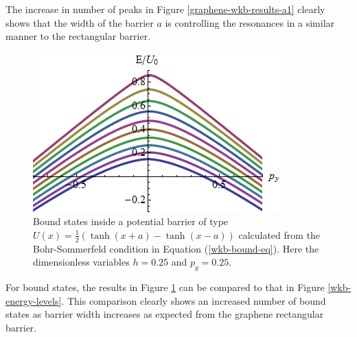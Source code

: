 			The increase in number of peaks in Figure \ref{graphene-wkb-results-a1} clearly shows that the width of the barrier $a$ is controlling the resonances in a similar manner to the rectangular barrier. 
		\begin{figure}[h]
			\centerline{\includegraphics[scale=0.6]{images/graphene-wkb-energy-levels-a2}}
			\caption{Bound states inside a potential barrier of type $U\left(x\right)=\frac{1}{2}\left(\tanh(x+a)-\tanh(x-a)\right)$ calculated from the Bohr-Sommerfeld condition in Equation (\ref{wkb-bound-eq}). Here the dimensionless variables $h=0.25$ and $p_{y}=0.25$.}
			\label{graphene-wkb-energy-levels-a2}
		\end{figure}

		For bound states, the results in Figure \ref{graphene-wkb-energy-levels-a2} can be compared to that in Figure \ref{wkb-energy-levels}. This comparison clearly shows an increased number of bound states as barrier width increases as expected from the graphene rectangular barrier.
%